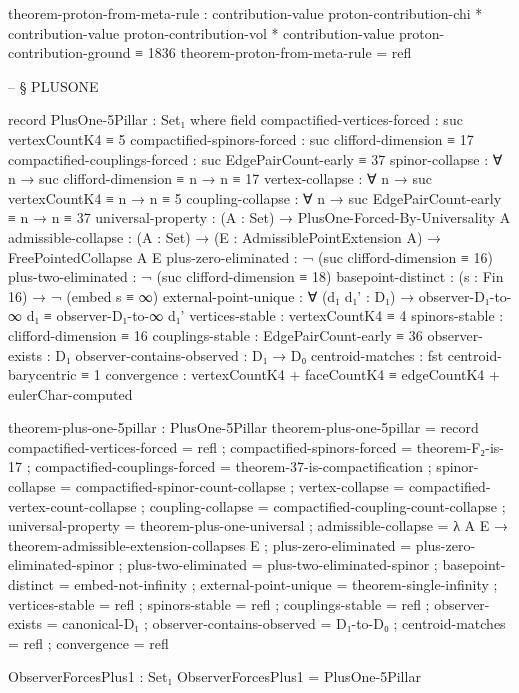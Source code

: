\documentclass[11pt,a4paper]{book}
\begin{document}
\begin{code}
theorem-proton-from-meta-rule :
  contribution-value proton-contribution-chi * 
  contribution-value proton-contribution-vol * 
  contribution-value proton-contribution-ground ≡ 1836
theorem-proton-from-meta-rule = refl


-- § PLUSONE

record PlusOne-5Pillar : Set₁ where
  field
    compactified-vertices-forced : suc vertexCountK4 ≡ 5
    compactified-spinors-forced : suc clifford-dimension ≡ 17
    compactified-couplings-forced : suc EdgePairCount-early ≡ 37
    spinor-collapse : ∀ n → suc clifford-dimension ≡ n → n ≡ 17
    vertex-collapse : ∀ n → suc vertexCountK4 ≡ n → n ≡ 5
    coupling-collapse : ∀ n → suc EdgePairCount-early ≡ n → n ≡ 37
    universal-property : (A : Set) → PlusOne-Forced-By-Universality A
    admissible-collapse : (A : Set) → (E : AdmissiblePointExtension A) → FreePointedCollapse A E
    plus-zero-eliminated : ¬ (suc clifford-dimension ≡ 16)
    plus-two-eliminated : ¬ (suc clifford-dimension ≡ 18)
    basepoint-distinct : (s : Fin 16) → ¬ (embed s ≡ ∞)
    external-point-unique : ∀ (d₁ d₁' : D₁) → observer-D₁-to-∞ d₁ ≡ observer-D₁-to-∞ d₁'
    vertices-stable : vertexCountK4 ≡ 4
    spinors-stable : clifford-dimension ≡ 16
    couplings-stable : EdgePairCount-early ≡ 36
    observer-exists : D₁
    observer-contains-observed : D₁ → D₀
    centroid-matches : fst centroid-barycentric ≡ 1
    convergence : vertexCountK4 + faceCountK4 ≡ edgeCountK4 + eulerChar-computed

theorem-plus-one-5pillar : PlusOne-5Pillar
theorem-plus-one-5pillar = record
  { compactified-vertices-forced = refl
  ; compactified-spinors-forced = theorem-F₂-is-17
  ; compactified-couplings-forced = theorem-37-is-compactification
  ; spinor-collapse = compactified-spinor-count-collapse
  ; vertex-collapse = compactified-vertex-count-collapse
  ; coupling-collapse = compactified-coupling-count-collapse
  ; universal-property = theorem-plus-one-universal
  ; admissible-collapse = λ A E → theorem-admissible-extension-collapses E
  ; plus-zero-eliminated = plus-zero-eliminated-spinor
  ; plus-two-eliminated = plus-two-eliminated-spinor
  ; basepoint-distinct = embed-not-infinity
  ; external-point-unique = theorem-single-infinity
  ; vertices-stable = refl
  ; spinors-stable = refl
  ; couplings-stable = refl
  ; observer-exists = canonical-D₁
  ; observer-contains-observed = D₁-to-D₀
  ; centroid-matches = refl
  ; convergence = refl
  }

ObserverForcesPlus1 : Set₁
ObserverForcesPlus1 = PlusOne-5Pillar


\end{code}
\end{document}
